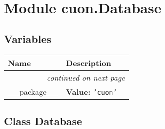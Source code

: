 %
%
%


\section{Module cuon.Database}

    \label{cuon:Database}


  \subsection{Variables}

    \vspace{-1cm}
\hspace{\varindent}\begin{longtable}{|p{\varnamewidth}|p{\vardescrwidth}|l}
\cline{1-2}
\cline{1-2} \centering \textbf{Name} & \centering \textbf{Description}& \\
\cline{1-2}
\endhead\cline{1-2}\multicolumn{3}{r}{\small\textit{continued on next page}}\\\endfoot\cline{1-2}
\endlastfoot\raggedright \_\-\_\-p\-a\-c\-k\-a\-g\-e\-\_\-\_\- & \raggedright \textbf{Value:} 
{\tt \texttt{'}\texttt{cuon}\texttt{'}}&\\
\cline{1-2}
\end{longtable}



\subsection{Class Database}

